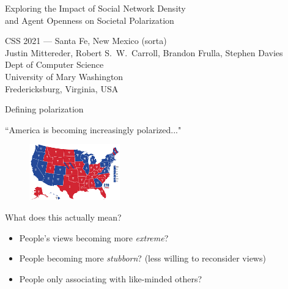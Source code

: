 \documentclass[12pt]{beamer}
\author{Mittereder, \textit{et. al.}}
\begin{document}
\begin{frame}[c]{} %

\begin{center}
\Large
Exploring the Impact of Social Network Density\\and Agent Openness on Societal Polarization

\footnotesize
\vspace{.3in}
CSS 2021 --- Santa Fe, New Mexico (sorta)\\
\vspace{.1in}
Justin Mittereder, Robert S.~W.~Carroll, Brandon Frulla, Stephen Davies\\
\scriptsize
\smallskip
Dept of Computer Science\\
University of Mary Washington\\
Fredericksburg, Virginia, USA\\
\end{center}

\end{frame}

\begin{frame}[c]{Defining polarization} %

\large

\centering
``America is becoming increasingly polarized..."

\vspace{-.2in}
\begin{figure}
\includegraphics[width=0.35\textwidth]{usa.png}
\end{figure}
\pause
\vspace{-.2in}
What does this actually mean?
\vspace{-.15in}
\pause

\small
\begin{itemize}
\itemsep.1em
\item People's views becoming more \textit{extreme}?
\pause
\item People becoming more \textit{stubborn}? (less willing to reconsider views)
\pause
\item People only associating with like-minded others?
\end{itemize}

\end{frame}
\end{document}
